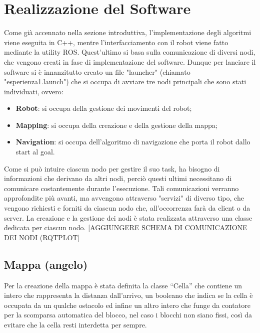 \documentclass[english]{article}
\begin{document}
\section{Realizzazione del Software}
Come già accennato nella sezione introduttiva, l'implementazione degli algoritmi viene eseguita in C++, mentre l'interfacciamento con il robot viene fatto mediante la utility ROS. Quest'ultimo si basa sulla comunicazione di diversi nodi, che vengono creati in fase di implementazione del software. Dunque per lanciare il software si è innanzitutto creato un file "launcher" (chiamato "esperienza1.launch") che si occupa di avviare tre nodi principali che sono stati individuati, ovvero:
\begin{itemize}
\item \textbf{Robot}: si occupa della gestione dei movimenti del robot;
\item \textbf{Mapping}: si occupa della creazione e della gestione della mappa;
\item \textbf{Navigation}: si occupa dell'algoritmo di navigazione che porta il robot dallo start al goal.
\end{itemize}
Come si può intuire ciascun nodo per gestire il suo task, ha bisogno di informazioni che derivano da altri nodi, perciò questi ultimi necessitano di comunicare costantemente durante l'esecuzione. Tali comunicazioni verranno approfondite più avanti, ma avvengono attraverso "servizi" di diverso tipo, che vengono richiesti e forniti da ciascun nodo che, all'occorrenza farà da client o da server. La creazione e la gestione dei nodi è stata realizzata attraverso una classe dedicata per ciascun nodo. [AGGIUNGERE SCHEMA DI COMUNICAZIONE DEI NODI (RQTPLOT]

\subsection{Mappa (angelo)}
Per la creazione della mappa è stata definita la classe “Cella” che contiene un intero che rappresenta la distanza dall’arrivo, un booleano che indica se la cella è occupata da un qualche ostacolo ed infine un altro intero che funge da contatore per la scomparsa automatica del blocco, nel caso i blocchi non siano fissi, così da evitare che la cella resti interdetta per sempre.
\end{document}

